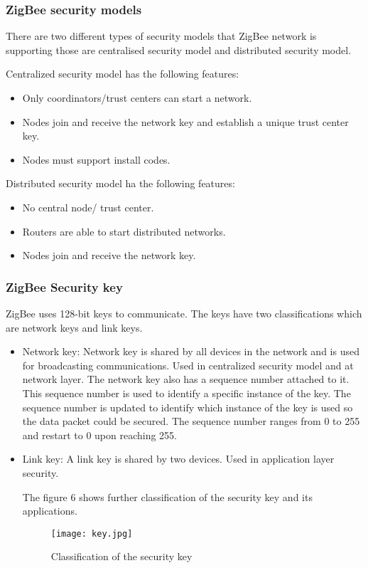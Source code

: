 \documentclass[conference]{IEEEtran}
\begin{document}
\subsubsection{ZigBee security models}
There are two different types of security models that ZigBee network is supporting those are centralised security model and distributed security model. 

Centralized security model has the following features:
\begin{itemize}
    \item Only coordinators/trust centers can start a network.
    \item       Nodes join and receive the network key and establish a unique trust center key.
    \item  Nodes must support install codes.
\end{itemize}
Distributed security model ha the following features:
\begin{itemize}
    \item No central node/ trust center.
    \item Routers are able to start distributed networks.
    \item Nodes join and receive the network key.\cite{Security_Analysis}
\end{itemize}

\subsubsection{ZigBee Security key}
ZigBee uses 128-bit keys to communicate. The keys have two classifications which are network keys and link keys. 
\begin{itemize}
    \item Network key: Network key is  shared by all devices in the network and is used for broadcasting communications. Used in centralized security model and at network layer. The network key also has a sequence number attached to it.  This sequence number is used to identify a specific instance of the key. The sequence number is updated to identify which instance of the key is used so the data packet could be secured. The sequence number ranges from 0 to 255 and restart to 0 upon reaching 255.
    \item Link key: A link key is shared by two devices. Used in application layer security.\cite{Security_AN1233}


The figure 6 shows further classification of the security key and its applications.\begin{figure}
    \centering
    \texttt{[image: key.jpg]}
    \caption{Classification of the security key\cite{Security_Analysis}}
    \label{Classification of the security key}
\end{figure}

\end{itemize}
\end{document}
